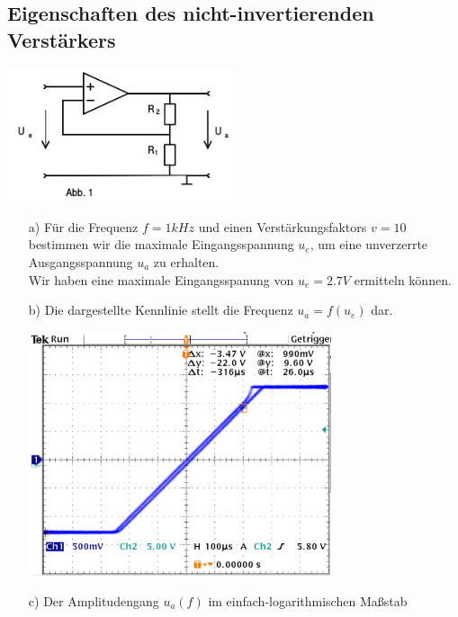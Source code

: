 \documentclass[11pt,a4paper,titlepage]{article}
\begin{document}
\subsection{Eigenschaften des nicht-invertierenden Verst\"arkers}
\begin{center}
\includegraphics[width=0.5\textwidth]{schalt-1-1}
\end{center}
\begin{itemize}
\item[a)] F\"ur die Frequenz $f=1kHz$ und einen Verst\"arkungsfaktors $v=10$ bestimmen wir die maximale Eingangsspannung $u_e$, um eine unverzerrte Ausgangsspannung $u_a$ zu erhalten. \\
Wir haben eine maximale Eingangsspanung von $u_e=2.7V$ ermitteln k\"onnen.
\newpage
\item[b)] Die dargestellte Kennlinie stellt die Frequenz $u_a=f(u_e)$ dar. \\
\begin{center}
\includegraphics[width=0.7\textwidth]{3}
\end{center}
\item[c)] Der Amplitudengang $u_a(f)$ im einfach-logarithmischen Ma\ss{}stab \\
\begin{center}

\end{center}
\end{itemize}
\end{document}
